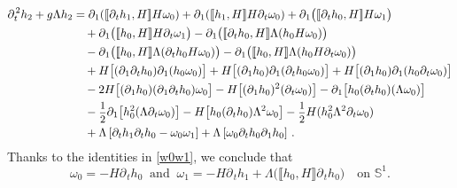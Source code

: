 \documentclass[11pt]{article}
\theoremstyle{plain}
\theoremstyle{definition}
\theoremstyle{definition}
\def\p{\text{\bf\emph{p}}}
\def\p{{\partial\hspace{1pt}}}
\def\comm#1#2{{\llbracket#1,#2\rrbracket}}
\def\smallexp#1{{\text{\small #1}}}
\def\dfrac#1#2{\smallexp{$\displaystyle{}\frac{#1}{#2}$}}
\begin{document}
\begin{align*}
\p_{\!t}^2 h_2 + g\Lambda h_2 &= \p_{\!1} (\comm{\p_{\!t} h_1}{H} H \omega_0) + \p_{\!1} (\comm{h_1}{H} H \p_{\!t} \omega_0) + \p_{\!1} \big(\comm{\p_{\!t} h_0}{H} H\omega_1\big) \\
&\quad +\p_{\!1} \big(\comm{h_0}{H} H \p_{\!t}\omega_1\big) - \p_{\!1} \big(\comm{\p_{\!t} h_0}{H} \Lambda (h_0 H \omega_0)\big) \\
&\quad - \p_{\!1} \big(\comm{h_0}{H} \Lambda (\p_{\!t} h_0 H \omega_0)\big) - \p_{\!1} \big(\comm{h_0}{H} \Lambda (h_0 H \p_{\!t} \omega_0)\big) \\
&\quad + H \big[(\p_{\!1} \p_{\!t} h_0) \p_{\!1}(h_0 \omega_0)\big] + H \big[(\p_{\!1} h_0) \p_{\!1}(\p_{\!t} h_0 \omega_0)\big]
 + H \big[(\p_{\!1} h_0) \p_{\!1}(h_0 \p_{\!t} \omega_0)\big] \nonumber\\
&\quad - 2 H \big[(\p_{\!1}h_0) (\p_{\!1} \p_{\!t} h_0) \omega_0\big] - H \big[(\p_{\!1}h_0)^2 (\p_{\!t} \omega_0)\big] - \p_{\!1} \big[h_0 (\p_{\!t} h_0) (\Lambda \omega_0) \big] \\
&\quad - \dfrac{1}{2} \p_{\!1} \big[h_0^2 (\Lambda \p_{\!t} \omega_0)\big] - H \big[h_0 (\p_{\!t} h_0)\Lambda^2 \omega_0\big] - \dfrac{1}{2} H (h_0^2 \Lambda^2 \p_{\!t} \omega_0)\\
&\quad +\Lambda \left[\partial_t h_{1}\partial_t h_{0}  - \omega_0\omega_{1}\right]+ \Lambda \left[ \omega_0 \partial_t h_{0} \p_{\!1} h_{0} \right] \,.
\end{align*}
Thanks to the identities in \eqref{w0w1}, we conclude that
$$
\omega_0=-H\p_{\!t} h_0\ \text{ and } \
\omega_1 = -H\p_{\!t} h_1 + \Lambda \big(\comm{h_0}{H}  \p_{\!t} h_0\big)\quad\text{on }\mathbb{S}^1.
$$
\end{document}
